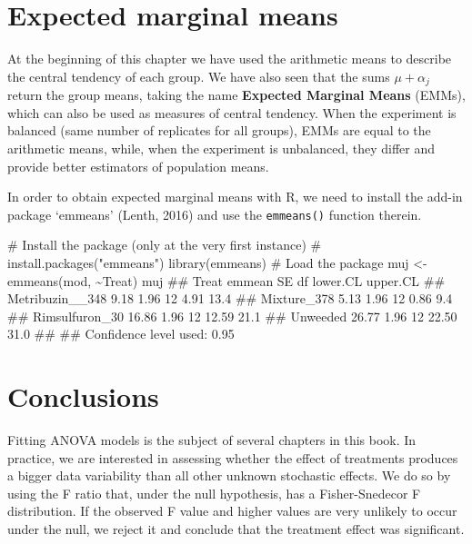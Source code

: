 \documentclass[a4paper,12pt,oneside]{book}
\newenvironment{Shaded}{\begin{snugshade}}{\end{snugshade}}
\newcommand{\SpecialCharTok}[1]{#1}
\newcommand{\CommentTok}[1]{#1}
\newcommand{\DocumentationTok}[1]{#1}
\newcommand{\OtherTok}[1]{#1}
\newcommand{\FunctionTok}[1]{#1}
\newcommand{\NormalTok}[1]{#1}
\begin{document}
\hypertarget{expected-marginal-means}{%
\section{Expected marginal means}\label{expected-marginal-means}}

At the beginning of this chapter we have used the arithmetic means to describe the central tendency of each group. We have also seen that the sums \(\mu + \alpha_j\) return the group means, taking the name \textbf{Expected Marginal Means} (EMMs), which can also be used as measures of central tendency. When the experiment is balanced (same number of replicates for all groups), EMMs are equal to the arithmetic means, while, when the experiment is unbalanced, they differ and provide better estimators of population means.

In order to obtain expected marginal means with R, we need to install the add-in package `emmeans' (Lenth, 2016) and use the \texttt{emmeans()} function therein.

\vspace{12pt}

\begin{Shaded}
\begin{Highlighting}[]
\CommentTok{\# Install the package (only at the very first instance)}
\CommentTok{\# install.packages("emmeans") }
\FunctionTok{library}\NormalTok{(emmeans) }\CommentTok{\# Load the package}
\NormalTok{muj }\OtherTok{\textless{}{-}} \FunctionTok{emmeans}\NormalTok{(mod, }\SpecialCharTok{\textasciitilde{}}\NormalTok{Treat)}
\NormalTok{muj}
\DocumentationTok{\#\#  Treat           emmean   SE df lower.CL upper.CL}
\DocumentationTok{\#\#  Metribuzin\_\_348   9.18 1.96 12     4.91     13.4}
\DocumentationTok{\#\#  Mixture\_378       5.13 1.96 12     0.86      9.4}
\DocumentationTok{\#\#  Rimsulfuron\_30   16.86 1.96 12    12.59     21.1}
\DocumentationTok{\#\#  Unweeded         26.77 1.96 12    22.50     31.0}
\DocumentationTok{\#\# }
\DocumentationTok{\#\# Confidence level used: 0.95}
\end{Highlighting}
\end{Shaded}

\hypertarget{conclusions-4}{%
\section{Conclusions}\label{conclusions-4}}

Fitting ANOVA models is the subject of several chapters in this book. In practice, we are interested in assessing whether the effect of treatments produces a bigger data variability than all other unknown stochastic effects. We do so by using the F ratio that, under the null hypothesis, has a Fisher-Snedecor F distribution. If the observed F value and higher values are very unlikely to occur under the null, we reject it and conclude that the treatment effect was significant.
\end{document}
